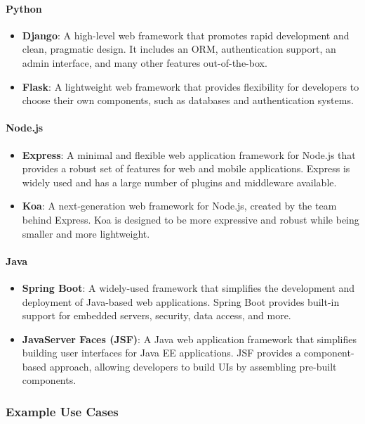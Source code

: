 \paragraph{Python}
\begin{itemize}
    \item \textbf{Django}: A high-level web framework that promotes rapid development and clean, pragmatic design. It includes an ORM, authentication support, an admin interface, and many other features out-of-the-box.
    \item \textbf{Flask}: A lightweight web framework that provides flexibility for developers to choose their own components, such as databases and authentication systems.
\end{itemize}

\paragraph{Node.js}
\begin{itemize}
    \item \textbf{Express}: A minimal and flexible web application framework for Node.js that provides a robust set of features for web and mobile applications. Express is widely used and has a large number of plugins and middleware available.
    \item \textbf{Koa}: A next-generation web framework for Node.js, created by the team behind Express. Koa is designed to be more expressive and robust while being smaller and more lightweight.
\end{itemize}

\paragraph{Java}
\begin{itemize}
    \item \textbf{Spring Boot}: A widely-used framework that simplifies the development and deployment of Java-based web applications. Spring Boot provides built-in support for embedded servers, security, data access, and more.
    \item \textbf{JavaServer Faces (JSF)}: A Java web application framework that simplifies building user interfaces for Java EE applications. JSF provides a component-based approach, allowing developers to build UIs by assembling pre-built components.
\end{itemize}

\subsubsection{Example Use Cases}

